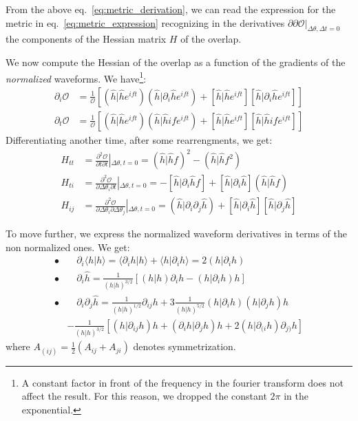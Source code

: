 \documentclass[twocolumn,showpacs,preprintnumbers,nofootinbib,prd,
superscriptaddress,10pt]{revtex4-2}
\newcommand{\scalar}[2]{\langle #1|#2 \rangle}
\newcommand{\rescalar}[2]{( #1|#2 )}
\newcommand{\imscalar}[2]{[ #1|#2 ]}
\begin{document}
From the above eq.~\eqref{eq:metric_derivation}, we can read the expression for the metric in eq.~\eqref{eq:metric_expression} recognizing in the derivatives $\partial\partial\mathcal{O}|_{\Delta\theta, \Delta t = 0}$ the components of the Hessian matrix $H$ of the overlap.

We now compute the Hessian of the overlap as a function of the gradients of the {\it normalized} waveforms.
We have\footnote{
A constant factor in front of the frequency in the fourier transform does not affect the result. For this reason, we dropped the constant $2\pi$ in the exponential.}:
\begin{align}
	\partial_i \mathcal{O} &= \frac{1}{\mathcal{O}} \left[ \rescalar{\hat{h}}{\hat{h}e^{ift}}\rescalar{\hat{h}}{\partial_i\hat{h}e^{ift}} + \imscalar{\hat{h}}{\hat{h}e^{ift}}\imscalar{\hat{h}}{\partial_i\hat{h}e^{ift}} \right]\\
	\partial_t \mathcal{O} &= \frac{1}{\mathcal{O}} \left[ \rescalar{\hat{h}}{\hat{h}e^{ift}}\rescalar{\hat{h}}{\hat{h}if e^{ift}} + \imscalar{\hat{h}}{\hat{h}e^{ift}}\imscalar{\hat{h}}{\hat{h}if e^{ift}} \right]
\end{align}
Differentiating another time, after some rearrengments, we get:
\begin{align}
H_{tt} &= \frac{\partial^2 \mathcal{O}}{\partial t \partial t } \left|_{\Delta\theta, t = 0} \right.
								= \rescalar{\hat{h}}{\hat{h}f}^2 - \rescalar{\hat{h}}{\hat{h}f^2} \label{eq:H_tt}\\
H_{ti} &= \frac{\partial^2 \mathcal{O}}{\partial \Delta \theta_i \partial t } \left|_{\Delta\theta, t = 0} \right.
								= - \imscalar{\hat{h}}{\partial_i \hat{h}f} + \imscalar{\hat{h}}{\partial_i\hat{h}} \rescalar{\hat{h}}{\hat{h}f} \label{eq:H_ti}\\
H_{ij} &= \frac{\partial^2 \mathcal{O}}{\partial \Delta \theta_i \partial \Delta \theta_j }\left|_{\Delta\theta, t = 0} \right.
								= \rescalar{\hat{h}}{\partial_i\partial_j\hat{h}} +\imscalar{\hat{h}}{\partial_i\hat{h}} \imscalar{\hat{h}}{\partial_j\hat{h}} \label{eq:H_ij}
\end{align}

To move further, we express the normalized waveform derivatives in terms of the non normalized ones. We get:
\begin{align*}
	\bullet&\quad \partial_i \scalar{h}{h} = \scalar{\partial_i h}{h}+ \scalar{h}{\partial_i h} = 2 \rescalar{h}{\partial_i h} \\
	\bullet&\quad \partial_i \hat{h} =\frac{1}{\rescalar{h}{h}^{3/2}} \left[ \rescalar{h}{h}\partial_i h -  \rescalar{h}{\partial_i h} h \right]	\\
	\bullet &\quad \partial_i \partial_j \hat{h} = \frac{1}{\rescalar{h}{h}^{1/2}} \partial_{ij}h 	+3 \frac{1}{\rescalar{h}{h}^{5/2}} \rescalar{h}{\partial_i h}\rescalar{h}{\partial_j h}h \\
	&- \frac{1}{\rescalar{h}{h}^{3/2}} \left[\rescalar{h}{ \partial_{ij} h} h + \rescalar{\partial_i h}{\partial_j h}  h
		+2\rescalar{h}{\partial_{(i} h} \partial_{j)} h \right]
\end{align*}
where $A_{(ij)} = \frac{1}{2}(A_{ij}+A_{ji})$ denotes symmetrization.
\end{document}
